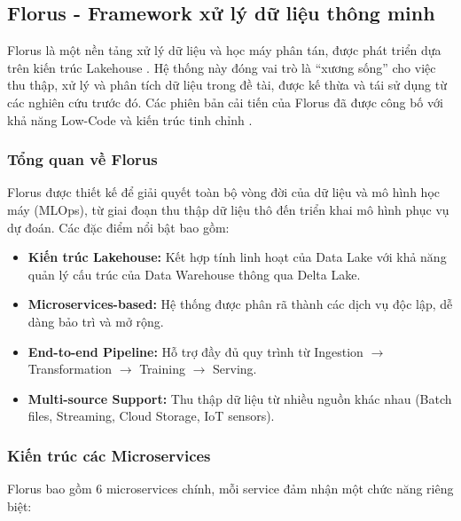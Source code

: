 \subsection{Florus - Framework xử lý dữ liệu thông minh}

Florus là một nền tảng xử lý dữ liệu và học máy phân tán, được phát triển dựa trên kiến trúc Lakehouse \cite{vo2023florus, vo2024florus}. Hệ thống này đóng vai trò là ``xương sống'' cho việc thu thập, xử lý và phân tích dữ liệu trong đề tài, được kế thừa và tái sử dụng từ các nghiên cứu trước đó. Các phiên bản cải tiến của Florus đã được công bố với khả năng Low-Code và kiến trúc tinh chỉnh \cite{phan2024lowcode, nguyen2025airquality}.

\subsubsection{Tổng quan về Florus}

Florus được thiết kế để giải quyết toàn bộ vòng đời của dữ liệu và mô hình học máy (MLOps), từ giai đoạn thu thập dữ liệu thô đến triển khai mô hình phục vụ dự đoán. Các đặc điểm nổi bật bao gồm:

\begin{itemize}
    \item \textbf{Kiến trúc Lakehouse:} Kết hợp tính linh hoạt của Data Lake với khả năng quản lý cấu trúc của Data Warehouse thông qua Delta Lake.

    \item \textbf{Microservices-based:} Hệ thống được phân rã thành các dịch vụ độc lập, dễ dàng bảo trì và mở rộng.

    \item \textbf{End-to-end Pipeline:} Hỗ trợ đầy đủ quy trình từ Ingestion $\rightarrow$ Transformation $\rightarrow$ Training $\rightarrow$ Serving.

    \item \textbf{Multi-source Support:} Thu thập dữ liệu từ nhiều nguồn khác nhau (Batch files, Streaming, Cloud Storage, IoT sensors).
\end{itemize}

\subsubsection{Kiến trúc các Microservices}

Florus bao gồm 6 microservices chính, mỗi service đảm nhận một chức năng riêng biệt:

